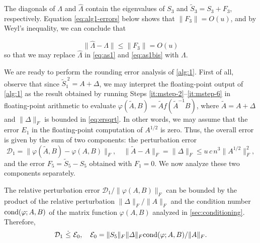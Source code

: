 \documentclass[DIV=14]{scrartcl}
\newcommand\ledot{~\dot{\le}~}
\theoremstyle{thmstyletwo}
\theoremstyle{definition}
\numberwithin{equation}{section}
\newcommand{\wh}{\widehat}
\newcommand{\wt}{\widetilde}
\renewcommand{\Delta}{\varDelta}
\renewcommand{\Lambda}{\varLambda}
\begin{document}
{The diagonals of $\Lambda$ and $\wh\Lambda$ contain the eigenvalues of $S_3$ and $\wt S_3=S_3+F_3$, respectively. Equation \eqref{eq:alg1-errors} below shows that $\|F_3\|=O(u)$, and by Weyl's inequality, we can conclude that

\begin{equation}\label{eq:lambda}
\|\wh\Lambda-\Lambda\|\le \|F_3\|=O(u)
\end{equation}
so that we may replace $\wh\Lambda$ in \eqref{eq:as1} and  \eqref{eq:as1bis} with $\Lambda$.

We are ready to perform the rounding error analysis of \cref{alg:1}. First of all, observe that since $\wt S_1^{\;2}=A+\Delta$, we may interpret the floating-point output of \cref{alg:1} as the result obtained by running Steps \ref{it:mstep-2}--\ref{it:mstep-6} in floating-point arithmetic to evaluate $\varphi(\wt A,B)=\wt Af(\wt A^{-1}B)$, where $\wt A=A+\Delta$ and $\|\Delta\|_F$ is bounded in \eqref{eq:ersqrt}. In other words, we may assume that the error $E_1$ in the floating-point computation  of $A^{1/2}$ is zero. Thus, the overall error is given by the sum of two components: the perturbation error
\[
    \mathcal D_1=\|\varphi(\wt A,B)-\varphi(A,B)\|_F,\quad \|\wt A-A\|_F=\|\Delta\|_F\leq u\, c\, n^3\|A^{1/2}\|_F^2,
\]
and the error $F_5=\wt S_5-S_5$ obtained with $F_1=0$.
We now analyze these two components separately.

The relative perturbation error $\mathcal D_1/\|\varphi(A,B)\|_F$ can be bounded by the product of the relative perturbation $\|\Delta\|_F/\|A\|_F$ and the condition number $\hbox{cond}(\varphi;A,B)$ of the matrix function $\varphi(A,B)$ analyzed in \cref{sec:conditioning}. Therefore,
\begin{equation}\label{eq:D}
\mathcal D_1\ledot\mathcal E_0,\quad \mathcal E_0= \|S_5\|_F\|\Delta\|_F\hbox{cond}(\varphi;A,B)/\|A\|_F.
\end{equation}

}
\end{document}
